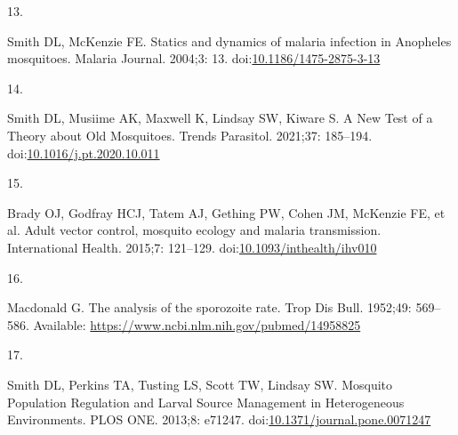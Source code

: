 \documentclass[
]{book}
\newlength{\cslhangindent}
\newlength{\csllabelwidth}
\newlength{\cslentryspacingunit} %
\newenvironment{CSLReferences}[2] %
 {%
  \setlength{\parindent}{0pt}
  \ifodd #1
  \let\oldpar\par
  \def\par{\hangindent=\cslhangindent\oldpar}
  \fi
  \setlength{\parskip}{#2\cslentryspacingunit}
 }%
 {}
\newcommand{\CSLLeftMargin}[1]{\parbox[t]{\csllabelwidth}{#1}}
\newcommand{\CSLRightInline}[1]{\parbox[t]{\linewidth - \csllabelwidth}{#1}\break}
\begin{document}
\begin{CSLReferences}{0}{0}
\leavevmode{}%
\CSLLeftMargin{13. }%
\CSLRightInline{Smith DL, McKenzie FE. Statics and dynamics of malaria infection in {Anopheles} mosquitoes. Malaria Journal. 2004;3: 13. doi:\href{https://doi.org/10.1186/1475-2875-3-13}{10.1186/1475-2875-3-13}}

\leavevmode{}%
\CSLLeftMargin{14. }%
\CSLRightInline{Smith DL, Musiime AK, Maxwell K, Lindsay SW, Kiware S. A {New} {Test} of a {Theory} about {Old} {Mosquitoes}. Trends Parasitol. 2021;37: 185--194. doi:\href{https://doi.org/10.1016/j.pt.2020.10.011}{10.1016/j.pt.2020.10.011}}

\leavevmode{}%
\CSLLeftMargin{15. }%
\CSLRightInline{Brady OJ, Godfray HCJ, Tatem AJ, Gething PW, Cohen JM, McKenzie FE, et al. Adult vector control, mosquito ecology and malaria transmission. International Health. 2015;7: 121--129. doi:\href{https://doi.org/10.1093/inthealth/ihv010}{10.1093/inthealth/ihv010}}

\leavevmode{}%
\CSLLeftMargin{16. }%
\CSLRightInline{Macdonald G. The analysis of the sporozoite rate. Trop Dis Bull. 1952;49: 569--586. Available: \url{https://www.ncbi.nlm.nih.gov/pubmed/14958825}}

\leavevmode{}%
\CSLLeftMargin{17. }%
\CSLRightInline{Smith DL, Perkins TA, Tusting LS, Scott TW, Lindsay SW. Mosquito {Population} {Regulation} and {Larval} {Source} {Management} in {Heterogeneous} {Environments}. PLOS ONE. 2013;8: e71247. doi:\href{https://doi.org/10.1371/journal.pone.0071247}{10.1371/journal.pone.0071247}}

\end{CSLReferences}
\end{document}
